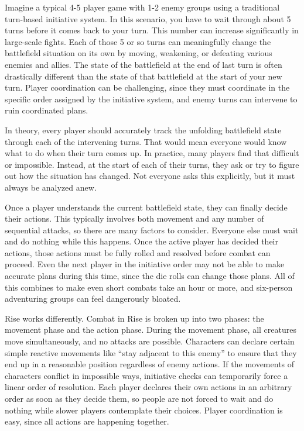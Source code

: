     Imagine a typical 4-5 player game with 1-2 enemy groups using a traditional turn-based initiative system.
    In this scenario, you have to wait through about 5 turns before it comes back to your turn.
    This number can increase significantly in large-scale fights.
    Each of those 5 or so turns can meaningfully change the battlefield situation on its own by moving, weakening, or defeating various enemies and allies.
    The state of the battlefield at the end of last turn is often drastically different than the state of that battlefield at the start of your new turn.
    Player coordination can be challenging, since they must coordinate in the specific order assigned by the initiative system, and enemy turns can intervene to ruin coordinated plans.

    In theory, every player should accurately track the unfolding battlefield state through each of the intervening turns.
    That would mean everyone would know what to do when their turn comes up.
    In practice, many players find that difficult or impossible.
    Instead, at the start of each of their turns, they ask or try to figure out how the situation has changed.
    Not everyone asks this explicitly, but it must always be analyzed anew.

    Once a player understands the current battlefield state, they can finally decide their actions.
    This typically involves both movement and any number of sequential attacks, so there are many factors to consider.
    Everyone else must wait and do nothing while this happens.
    Once the active player has decided their actions, those actions must be fully rolled and resolved before combat can proceed.
    Even the next player in the initiative order may not be able to make accurate plans during this time, since the die rolls can change those plans.
    All of this combines to make even short combats take an hour or more, and six-person adventuring groups can feel dangerously bloated.

    Rise works differently.
    Combat in Rise is broken up into two phases: the movement phase and the action phase.
    During the movement phase, all creatures move simultaneously, and no attacks are possible.
    Characters can declare certain simple reactive movements like ``stay adjacent to this enemy'' to ensure that they end up in a reasonable position regardless of enemy actions.
    If the movements of characters conflict in impossible ways, initiative checks can temporarily force a linear order of resolution.
    Each player declares their own actions in an arbitrary order as soon as they decide them, so people are not forced to wait and do nothing while slower players contemplate their choices.
    Player coordination is easy, since all actions are happening together.

